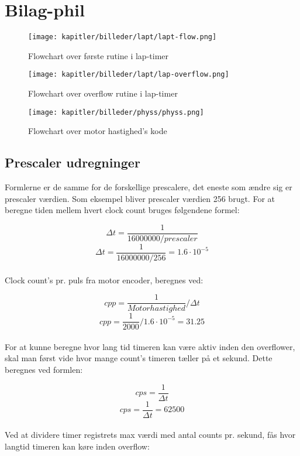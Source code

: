 \newpage

\section{Bilag-phil}

\begin{figure}[h]
\centering
\texttt{[image: kapitler/billeder/lapt/lapt-flow.png]}
\caption{Flowchart over første rutine i lap-timer}
\label{fig:lapt-flow}
\end{figure}

\newpage
\begin{figure}[h]
\centering
\texttt{[image: kapitler/billeder/lapt/lap-overflow.png]}
\caption{Flowchart over overflow rutine i lap-timer}
\label{fig:lap-overflow}
\end{figure}

\newpage
\begin{figure}[h]
\centering
\texttt{[image: kapitler/billeder/physs/physs.png]}
\caption{Flowchart over motor hastighed's kode}
\label{fig:physs}
\end{figure}


\newpage
\subsection{Prescaler udregninger}
\label{subsec:prescaler_udregninger}
Formlerne er de samme for de forskellige prescalere, det eneste som ændre sig er prescaler værdien. Som eksempel bliver prescaler værdien 256 brugt. For at beregne tiden mellem hvert clock count bruges følgendene formel:

$$\Delta t = \frac{1}{16000000/prescaler}$$
$$\Delta t = \frac{1}{16000000/256} = 1.6 \cdot 10^{-5}$$\\

Clock count's pr. puls fra motor encoder, beregnes ved:

$$cpp = \frac{1}{Motor hastighed} / \Delta t$$
$$cpp = \frac{1}{2000} / 1.6 \cdot 10^{-5} = 31.25$$\\

For at kunne beregne hvor lang tid timeren kan være aktiv inden den overflower, skal man først vide hvor mange count's timeren tæller på et sekund. Dette beregnes ved formlen:

$$cps = \frac{1}{\Delta t}$$
$$cps = \frac{1}{\Delta t} = 62500$$\\

Ved at dividere timer registrets max værdi med antal counts pr. sekund, fås hvor langtid timeren kan køre inden overflow:

